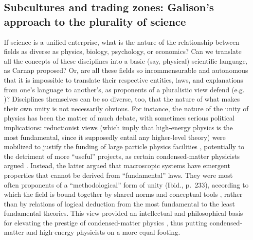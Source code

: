 \documentclass[smallextended]{svjour3}
\begin{document}
\subsection{Subcultures and trading zones: Galison's approach to the plurality of science}\label{section:galison}

If science is a unified enterprise, what is the nature of the relationship between fields as diverse as physics, biology, psychology, or economics? Can we translate all the concepts of these disciplines into a basic (say, physical) scientific language, as Carnap proposed? Or, are all these fields so incommensurable and autonomous that it is impossible to translate their respective entities, laws, and explanations from one's language to another's, as proponents of a pluralistic view defend (e.g. \citet{Suppes1978,Dupre1983,Cartwright1999})? Disciplines themselves can be so diverse, too, that the nature of what makes their own unity is not necessarily obvious. For instance, the nature of the unity of physics has been the matter of much debate, with sometimes serious political implications: reductionist views (which imply that high-energy physics is the most fundamental, since it supposedly entail any higher-level theory) were mobilized to justify the funding of large particle physics facilities \citep{Cat1998}, potentially to the detriment of more ``useful'' projects, as certain condensed-matter physicists argued \citep[Ch.~9]{martin2018solid}. Instead, the latter argued that macroscopic systems have emergent properties that cannot be derived from ``fundamental'' laws. They were most often proponents of a ``methodological'' form of unity (Ibid., p.~233), according to which the field is bound together by shared norms and conceptual tools \citep[p.~267]{Cat1998}, rather than by relations of logical deduction from the most fundamental to the least fundamental theories. This view provided an intellectual and philosophical basis for elevating the prestige of condensed-matter physics \citep[p.~148--149]{martin2018solid}, thus putting condensed-matter and high-energy physicists on a more equal footing.
\end{document}
